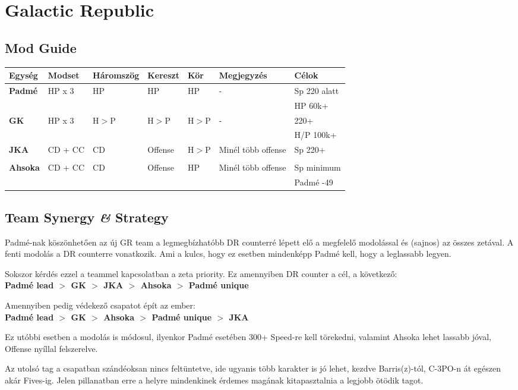 \documentclass[11pt]{report}
\begin{document}
\chapter{Galactic Republic}
\section{Mod Guide}
\begin{center}
    \begin{tabular}{|l | l | l | l | l | l | l |}
        \hline
        Egység & Modset & Háromszög & Kereszt & Kör & Megjegyzés & Célok\\ \hline
        \textbf{Padmé} & HP x 3 & HP & HP & HP & - & Sp 220 alatt\\ 
        &  &  &  &  &  & HP 60k+\\ \hline
        \textbf{GK} & HP x 3 & H$>$P & H$>$P & H$>$P & - & 220+\\
        &  &  &  &  &  & H/P 100k+\\ \hline        
        \textbf{JKA} & CD + CC & CD & Offense & H$>$P & Minél több offense & Sp 220+\\
        &  &  &  &  &  & \\ \hline
        \textbf{Ahsoka} & CD + CC & CD & Offense & HP & Minél több offense & Sp minimum\\
        &  &  &  &  &  & Padmé -49\\ \hline        
    \end{tabular}
\end{center}
\section{Team Synergy \textit{\&} Strategy}
Padmé-nak köszönhetően az új GR team a legmegbízhatóbb DR counterré lépett elő a megfelelő modolással és (sajnos) az összes zetával. A fenti modolás a DR counterre vonatkozik. Ami a kulcs, hogy ez esetben mindenképp Padmé kell, hogy a leglassabb legyen.\par
Sokszor kérdés ezzel a teammel kapcsolatban a zeta priority. Ez amennyiben DR counter a cél, a következő:\\
\textbf{Padmé lead $>$ GK $>$ JKA $>$ Ahsoka $>$ Padmé unique}\par
Amennyiben pedig védekező csapatot épít az ember:\\
\textbf{Padmé lead $>$ GK $>$ Ahsoka $>$ Padmé unique $>$ JKA}\par
Ez utóbbi esetben a modolás is módosul, ilyenkor Padmé esetében 300+ Speed-re kell törekedni, valamint Ahsoka lehet lassabb jóval, Offense nyíllal felszerelve.\par
Az utolsó tag a csapatban szándéoksan nincs feltüntetve, ide ugyanis több karakter is jó lehet, kezdve Barris(z)-tól, C-3PO-n át egészen akár Fives-ig. Jelen pillanatban erre a helyre mindenkinek érdemes magának kitapasztalnia a legjobb ötödik tagot.
\end{document}
